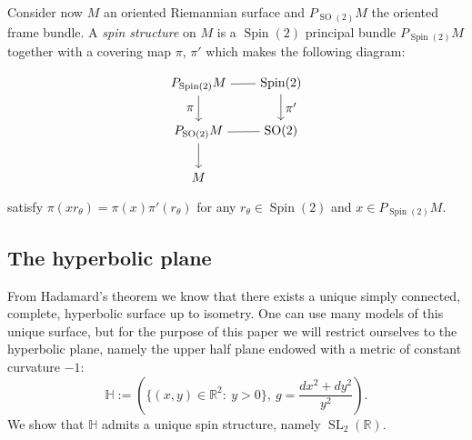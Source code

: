 \documentclass[12pt]{amsart}
\theoremstyle{definition}
\def\RR{{\mathbb R}}
\def\HH{{\mathbb{H}}}
\newcommand{\slinear}{\operatorname{SL}}
\newcommand{\so}{\operatorname{SO}}
\newcommand{\spin}{\operatorname{Spin}}
\begin{document}
Consider now $M$ an oriented Riemannian surface and $P_{\so(2)}M$ the oriented frame bundle. A \emph{spin structure} on $M$ is a $\spin(2)$ principal bundle $P_{\spin(2)}M$ together with a covering map $\pi$, $\pi'$ which makes the following diagram:
\begin{equation}\label{spinStructureDiagram}
\begin{tikzpicture}[baseline=(current  bounding  box.center)]
  \matrix (m) [matrix of math nodes,row sep=2em,column sep=2em,minimum width=2em]
  {
      P_{\text{Spin}(2)} M & \text{Spin}(2) \\
        P_{\text{SO}(2)} M & \text{SO}(2) \\
	    M & {} \\  
  };
  \path
    (m-1-1) edge node [ above] {} (m-1-2)
    (m-2-1) edge node [below] {} (m-2-2);
    
    
  \path[->] 
  	(m-1-1) edge node [left]{$\pi$} (m-2-1)
  	(m-1-2) edge node [right] {$\pi'$} (m-2-2)
  	(m-2-1) edge node [left] {} (m-3-1);
\end{tikzpicture}
\end{equation}
satisfy $\pi(xr_{\theta}) = \pi(x) \pi'(r_{\theta})$ for any $r_{\theta}\in \spin(2)$ and $x \in P_{\spin(2)} M$.


\subsection{The hyperbolic plane}
From Hadamard's theorem we know that there exists a unique simply connected, complete, hyperbolic surface up to isometry. One can use many models of this unique surface, but for the purpose of this paper we will restrict ourselves to the hyperbolic plane, namely the upper half plane endowed with a metric of constant curvature $-1$:
\[
\HH := \left( \{ (x,y)\in \RR^2 : \ y>0 \}, \ g=\frac{dx^2+ dy^2}{y^2} \right).
\]
We show that $\HH$ admits a unique spin structure, namely $\slinear_2(\RR)$. 
\end{document}
